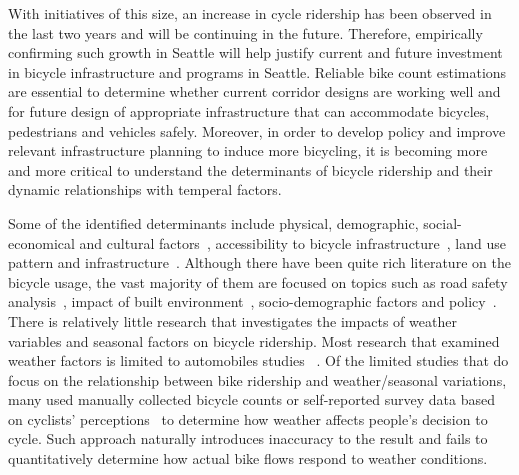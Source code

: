 \documentclass [11pt, proquest] {uwthesis}[2015/03/03]
\begin{document}
With initiatives of this size, an increase in cycle ridership has been observed in the last two years and will be continuing in the future. Therefore, empirically confirming such growth in Seattle will help justify current and future investment in bicycle infrastructure and programs in Seattle. Reliable bike count estimations are essential to determine whether current corridor designs are working well and for future design of appropriate infrastructure that can accommodate bicycles, pedestrians and vehicles safely. 
Moreover, in order to develop policy and improve relevant infrastructure planning to induce more bicycling, it is becoming more and more critical to understand the determinants of bicycle ridership and their dynamic relationships with temperal factors. 

Some of the identified determinants include physical, demographic, social-economical and cultural factors~\cite{Xing10,Pucher10,Krizek09}, accessibility to bicycle infrastructure~\cite{Voros07}, land use pattern and infrastructure~\cite{Dunlap15}. Although there have been quite rich literature on the bicycle usage, the vast majority of them are focused on topics such as road safety analysis~\cite{Kim07}, impact of built environment~\cite{Pucher10}, socio-demographic factors and policy~\cite{Garrard08,Xing10}. There is relatively little research that investigates the impacts of weather variables and seasonal factors on bicycle ridership. Most research that examined weather factors is limited to automobiles studies%
~\cite{Miranda-Moreno:2011aa,Rose:2011aa,Nosal:2014aa,Rose07}. Of the limited studies that do focus on the relationship between bike ridership and weather/seasonal variations, many used manually collected bicycle counts or self-reported survey data based on cyclists' perceptions~\cite{Nankervis99,Winters07,Richardson:2000aa,Richardson06} to determine how weather affects people's decision to cycle. Such approach naturally introduces inaccuracy to the result and fails to quantitatively determine how actual bike flows respond to weather conditions. 


\end{document}
